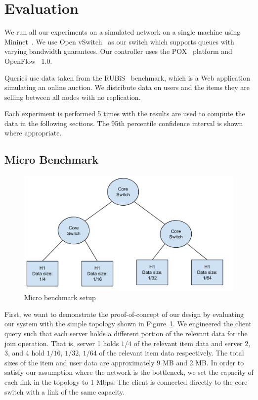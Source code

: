 \documentclass{sig-alternate-2013}
\begin{document}
\section{Evaluation}

We run all our experiments on a simulated network on a single machine using Mininet~\cite{Lantz2010}.
We use Open vSwitch~\cite{Pfaff2009} as our switch which supports queues with varying bandwidth guarantees.
Our controller uses the POX~\cite{Gude2008} platform and OpenFlow~\cite{McKeown2008} 1.0.

Queries use data taken from the RUBiS~\cite{Cecchet2002} benchmark, which is a Web application simulating an online auction.
We distribute data on users and the items they are selling between all nodes with no replication.

Each experiment is performed 5 times with the results are used to compute the data in the following sections.
The 95th percentile confidence interval is shown where appropriate.

\subsection{Micro Benchmark}
\begin{figure}
    \centering
    \includegraphics[scale=2.5]{figures/Join_micro_benchmark.png}
    \caption{Micro benchmark setup}\label{fig:micro_benchmark}
\end{figure}

First, we want to demonstrate the proof-of-concept of our design by evaluating our system with the simple topology shown in Figure~\ref{fig:micro_benchmark}.
We engineered the client query such that each server holds a different portion of the relevant data for the join operation.
That is, server 1 holds $1/4$ of the relevant item data and server 2, 3, and 4 hold $1/16$, $1/32$, $1/64$ of the relevant item data respectively.
The total sizes of the item and user data are approximately 9 MB and 2 MB\@.
In order to satisfy our assumption where the network is the bottleneck, we set the capacity of each link in the topology to 1 Mbps.
The client is connected directly to the core switch with a link of the same capacity.
\end{document}
